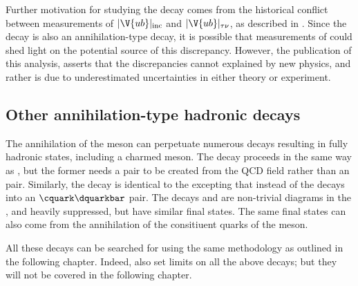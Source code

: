 Further motivation for studying the decay \btodsphi comes from the
historical conflict between measurements of
$|\V{ub}|_\mathrm{inc}$ and $|\V{ub}|_{\tau\nu}$, as described in .
Since the decay \decay{\Bp}{\taup\nu_\tau} is also an annihilation-type decay, it is possible that
measurements of \btodsphi could shed light on the potential source of this discrepancy.
However, the publication of this analysis,  asserts that the
discrepancies cannot explained by new physics, and rather is due to underestimated uncertainties in
either theory or experiment.








\subsection{Other annihilation-type hadronic decays}
The annihilation of the \Bp meson can perpetuate numerous decays resulting in fully hadronic
states, including a charmed meson.
The decay \decay{\Bp}{\Dp\Kstarz} proceeds in the same way as
\btodsphi, but the former needs a \ddbar pair to be created from the QCD field rather than an
\ssbar pair.
Similarly, the decay \decay{\Bp}{\Ds\Kstarzb} is identical to the \btodsphi excepting that instead
of \decay{\Wp}{\cquark\squarkbar} the \Wp decays into an $\cquark\dquarkbar$ pair.
The decays \decay{\Bp}{\Dp\Kstarzb} and \decay{\Bp}{\Ds\Kstarz} are non-trivial diagrams in the
\sm, and heavily suppressed, but have similar final states.
The same final states can also come from the annihilation of the consitiuent
quarks of the \Bc meson.

All these decays can be searched for using the same methodology as outlined in the following
chapter.
Indeed,  also set limits on all the above decays; but they will not be
covered in the following chapter.

































